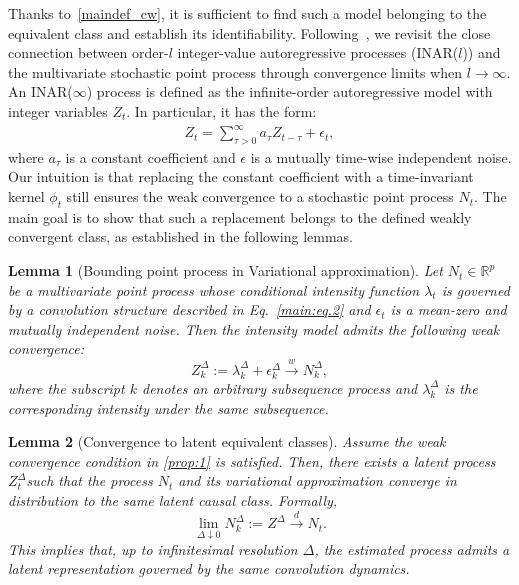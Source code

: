 \documentclass[10pt]{article}
\numberwithin{figure}{section}
\newtheorem{lemma}{Lemma}
\begin{document}
Thanks to~\autoref{maindef_cw}, it is sufficient to find such a model belonging to the equivalent class and establish its identifiability. Following~\citet{kirchner_hawkes_2016}, we revisit the close connection between order-$l$ integer-value autoregressive processes (INAR($l$)) and the multivariate stochastic point process through convergence limits when $l\rightarrow\infty$.  An INAR($\infty$) process is defined as the infinite-order autoregressive model with integer variables $Z_t$. In particular, it has the form:
\begin{align}
    Z_t = \sum\limits_{\tau>0}^{\infty}a_{\tau}Z_{t-\tau}+ \epsilon_t,
\end{align}
where $a_{\tau}$ is a constant coefficient and $\epsilon$ is a mutually time-wise independent noise. Our intuition is that replacing the constant coefficient with a time-invariant kernel $\phi_t$ still ensures the weak convergence to a stochastic point process $N_t$.  The main goal is to show that such a replacement belongs to the defined weakly convergent class, as established in the following lemmas.
\begin{lemma}[Bounding point process in Variational approximation]\label{prop:1}
Let \( N_t \in \mathbb{R}^p \) be a multivariate point process whose conditional intensity function $\lambda_t$ is governed by a convolution structure described in Eq.~\eqref{main:eq.2} and \( \epsilon_t \) is a mean-zero and mutually independent noise. Then the intensity model admits the following weak convergence:
\begin{equation}\label{converge1}
    Z_k^{\Delta}:= \lambda_k^{\Delta} + \epsilon_k^{\Delta} \xrightarrow{w} N_k^{\Delta},
\end{equation}
where the subscript $k$ denotes an arbitrary subsequence process and $\lambda_k^{\Delta}$ is the corresponding intensity under the same subsequence.
\end{lemma}
\begin{lemma}[Convergence to latent equivalent classes]\label{prop:1_2}
Assume the weak convergence condition in \autoref{prop:1} is satisfied. Then, there exists a latent process \( Z_t^{\Delta}\)such that the process \( N_t \) and its variational approximation converge in distribution to the same latent causal class. Formally,
\begin{equation}\label{converge_2}
    \lim_{\Delta \downarrow 0} N_k^{\Delta}:=Z^{\Delta} \xrightarrow{d} N_t.
\end{equation}
This implies that, up to infinitesimal resolution \( \Delta \), the estimated process admits a latent representation governed by the same convolution dynamics.
\end{lemma}
\end{document}
